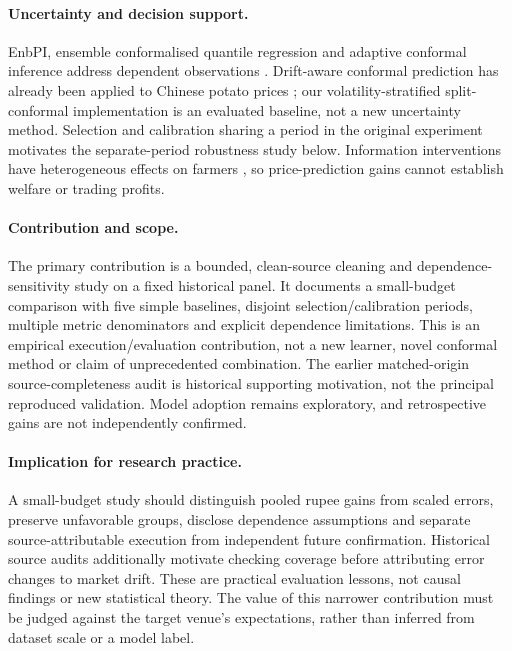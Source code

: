 \paragraph{Uncertainty and decision support.}
EnbPI, ensemble conformalised quantile regression and adaptive conformal inference address dependent observations \cite{xu2023conformal,jensen2024encqr,gibbs2021adaptive}. Drift-aware conformal prediction has already been applied to Chinese potato prices \cite{ouyang2026potato}; our volatility-stratified split-conformal implementation is an evaluated baseline, not a new uncertainty method. Selection and calibration sharing a period in the original experiment motivates the separate-period robustness study below. Information interventions have heterogeneous effects on farmers \cite{jensen2007digital,goyal2010information,fafchamps2012sms,mitra2018asymmetric}, so price-prediction gains cannot establish welfare or trading profits.

\paragraph{Contribution and scope.}
The primary contribution is a bounded, clean-source cleaning and dependence-sensitivity study on a fixed historical panel. It documents a small-budget comparison with five simple baselines, disjoint selection/calibration periods, multiple metric denominators and explicit dependence limitations. This is an empirical execution/evaluation contribution, not a new learner, novel conformal method or claim of unprecedented combination. The earlier matched-origin source-completeness audit is historical supporting motivation, not the principal reproduced validation. Model adoption remains exploratory, and retrospective gains are not independently confirmed.

\paragraph{Implication for research practice.}
A small-budget study should distinguish pooled rupee gains from scaled errors, preserve unfavorable groups, disclose dependence assumptions and separate source-attributable execution from independent future confirmation. Historical source audits additionally motivate checking coverage before attributing error changes to market drift. These are practical evaluation lessons, not causal findings or new statistical theory. The value of this narrower contribution must be judged against the target venue's expectations, rather than inferred from dataset scale or a model label.
